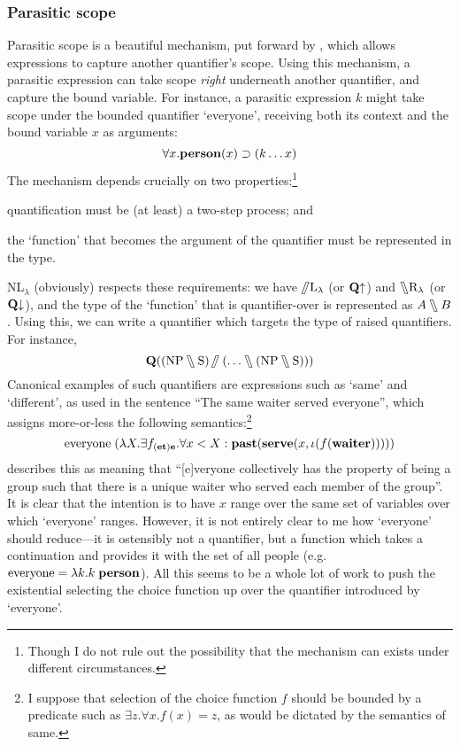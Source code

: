 

\subsubsection{Parasitic scope}
Parasitic scope is a beautiful mechanism, put forward by
\citet{barker2007}, which allows expressions to capture another
quantifier's scope. Using this mechanism, a parasitic expression can
take scope \emph{right} underneath another quantifier, and capture the
bound variable. For instance, a parasitic expression $k$ might take
scope under the bounded quantifier `everyone', receiving both its
context and the bound variable $x$ as arguments:
\[
  \forall{x}.\PERSON(x)\supset(k\ldots{x})
\]
The mechanism depends crucially on two properties:\footnote{%
  Though I do not rule out the possibility that the mechanism can
  exists under different circumstances.
}
\begin{enumerate*}[label=(\arabic*)]
\item quantification must be (at least) a two-step process; and
\item the `function' that becomes the argument of the quantifier must
  be represented in the type.
\end{enumerate*}
NL$_\lambda$ (obviously) respects these requirements: we have
$\himpl\text{L}_\lambda$ (or $\qup$) and $\himpr\text{R}_\lambda$ (or
$\qdown$), and the type of the `function' that is quantifier-over is
represented as ${A}\himpr{B}$. Using this, we can write a quantifier
which targets the type of raised quantifiers. For instance,
\[
  \q[(\NP\himpr\S)\himpl(\ldots\himpr(\NP\himpr\S))]
\]
Canonical examples of such quantifiers are expressions such as `same'
and `different', as used in the sentence ``The same waiter served
everyone'', which \citet{barker2007} assigns more-or-less the
following semantics:\footnote{%
  I suppose that selection of the choice function $f$ should be
  bounded by a predicate such as $\exists{z}.\forall{x}.f(x)=z$, as
  would be dictated by the semantics of same.
}
\[
  \text{everyone}\;(\lambda{X}.\exists{f_{(\e\t)\e}}.\forall{x<X}:
  \PAST(\SERVE(x,\iota(f(\WAITER)))))
\]
\citeauthor{barker2007} describes this as meaning that ``[e]veryone
collectively has the property of being a group such that there is a
unique waiter who served each member of the group''. It is clear that
the intention is to have $x$ range over the same set of variables over
which `everyone' ranges. However, it is not entirely clear to me how
`everyone' should reduce---it is ostensibly not a quantifier, but a
function which takes a continuation and provides it with the set of
all people (e.g.\ $\text{everyone}=\lambda{k}.k\;\PERSON$). All this
seems to be a whole lot of work to push the existential selecting the
choice function up over the quantifier introduced by `everyone'.

